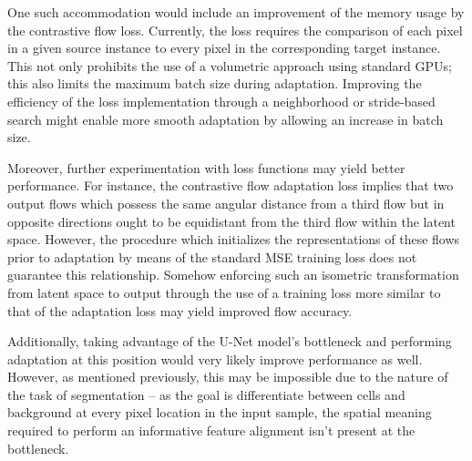 One such accommodation would include an improvement of the memory usage by the contrastive flow loss. Currently, the loss requires the comparison of each pixel in a given source instance to every pixel in the corresponding target instance. This not only prohibits the use of a volumetric approach using standard GPUs; this also limits the maximum batch size during adaptation. Improving the efficiency of the loss implementation through a neighborhood or stride-based search might enable more smooth adaptation by allowing an increase in batch size.

Moreover, further experimentation with loss functions may yield better performance. For instance, the contrastive flow adaptation loss implies that two output flows which possess the same angular distance from a third flow but in opposite directions ought to be equidistant from the third flow within the latent space. However, the procedure which initializes the representations of these flows prior to adaptation by means of the standard MSE training loss does not guarantee this relationship. Somehow enforcing such an isometric transformation from latent space to output through the use of a training loss more similar to that of the adaptation loss may yield improved flow accuracy.

Additionally, taking advantage of the U-Net model's bottleneck and performing adaptation at this position would very likely improve performance as well. However, as mentioned previously, this may be impossible due to the nature of the task of segmentation -- as the goal is differentiate between cells and background at every pixel location in the input sample, the spatial meaning required to perform an informative feature alignment isn't present at the bottleneck.